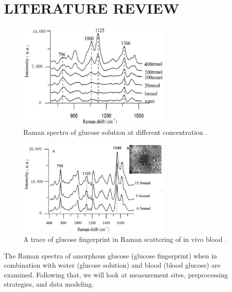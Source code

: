 \setlength{\footskip}{8mm}

\chapter{LITERATURE REVIEW}


\begin{figure}
    \caption{Raman spectra of glucose solution at different concentration \citep{solutionGlucose}.}
    \centerline{\includegraphics[width=3in]{figures/solutionGlucose-RS.jpeg}} \label{fig:solutionGlucose-RS}
\end{figure}

\begin{figure}
    \caption{A trace of glucose fingerprint in Raman scattering of in vivo blood \citep{solutionGlucose}.}
    \centerline{\includegraphics[width=3in]{figures/bloodGlucose-RS-2012.jpeg}}\label{fig:bloodGlucose-relative1125}
\end{figure}

The Raman spectra of amorphous glucose (glucose fingerprint) when in combination with water (glucose solution) and blood (blood glucose) are examined. Following that, we will look at measurement sites, preprocessing strategies, and data modeling.
\\
